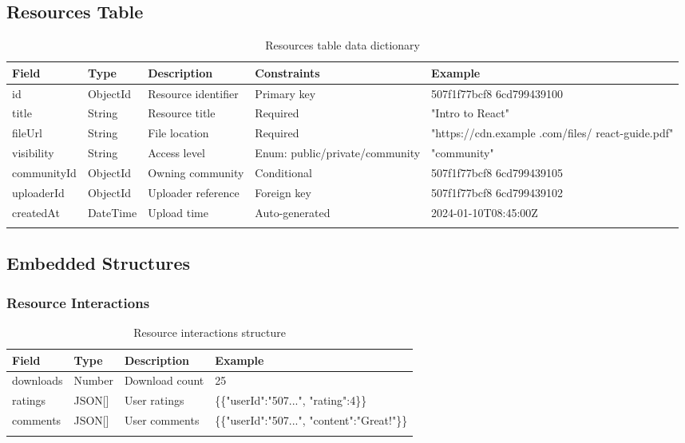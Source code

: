 \subsection{Resources Table}
\begin{longtable}{|L{3cm}|C{2cm}|L{2.5cm}|L{3cm}|L{4cm}|}
\hline
\textbf{Field} & \textbf{Type} & \textbf{Description} & \textbf{Constraints} & \textbf{Example} \\ \hline
\endhead

id & ObjectId & Resource identifier & Primary key & 507f1f77bcf8 6cd799439100 \\ \hline
title & String & Resource title & Required & "Intro to React" \\ \hline
fileUrl & String & File location & Required & "https://cdn.example .com/files/ react-guide.pdf" \\ \hline
visibility & String & Access level & Enum: public/private/community & "community" \\ \hline
communityId & ObjectId & Owning community & Conditional & 507f1f77bcf8 6cd799439105 \\ \hline
uploaderId & ObjectId & Uploader reference & Foreign key & 507f1f77bcf8 6cd799439102 \\ \hline
createdAt & DateTime & Upload time & Auto-generated & 2024-01-10T08:45:00Z \\ \hline

\caption{Resources table data dictionary}
\label{tab:resources_dict}
\end{longtable}

\subsection{Embedded Structures}

\subsubsection{Resource Interactions}
\begin{longtable}{|C{2.5cm}|C{1.8cm}|C{4cm}|C{4cm}|}
\hline
\textbf{Field} & \textbf{Type} & \textbf{Description} & \textbf{Example} \\ \hline
\endhead

downloads & Number & Download count & 25 \\ \hline
ratings & JSON[] & User ratings & \{\{"userId":"507...", "rating":4\}\} \\ \hline
comments & JSON[] & User comments & \{\{"userId":"507...", "content":"Great!"\}\} \\ \hline

\caption{Resource interactions structure}
\label{tab:resource_interactions}
\end{longtable}

